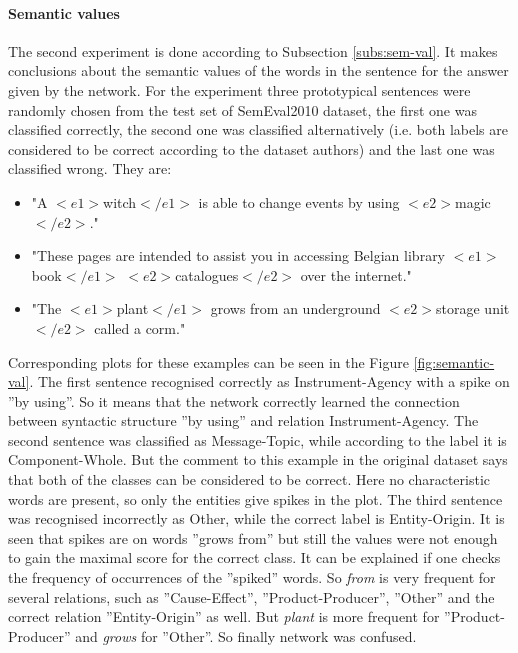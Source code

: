 \paragraph{Semantic values} The second experiment is done according to Subsection \ref{subs:sem-val}. It makes conclusions about the semantic values of the words in the sentence for the answer given by the network. For  
the experiment three prototypical sentences were randomly chosen from the test set of SemEval2010 dataset, the first one was classified 
correctly, the second one was classified alternatively (i.e. both labels are considered to be correct 
according to the dataset authors) and the last one was classified wrong. They are:
\begin{itemize}
  \item "A $<e1>$witch$</e1>$ is able to change events by using $<e2>$magic$</e2>$."
  \item "These pages are intended to assist you in accessing Belgian library $<e1>$book$</e1>$ $<e2>$catalogues$</e2>$ over the internet."
  \item "The $<e1>$plant$</e1>$ grows from an underground $<e2>$storage unit$</e2>$ called a corm."
\end{itemize} 
Corresponding plots for these examples can be seen in the Figure \ref{fig:semantic-val}. The first sentence recognised correctly as Instrument-Agency with a spike on ''by using''. So it means 
that the network correctly learned the connection between syntactic structure ''by using'' and 
relation Instrument-Agency. The second sentence was classified as Message-Topic, while according to the label it is Component-Whole. But the comment to this example in the original 
dataset says that both of the classes can be considered to be correct. Here no characteristic words are present, so only the entities 
give spikes in the plot. The third sentence was recognised incorrectly as Other, while the correct 
label is Entity-Origin. It is seen that spikes are on words ''grows from'' but still 
the values were not enough to gain the maximal score for the correct class. It can be explained if one checks the frequency of 
occurrences of the ''spiked'' words. So \textit{from} is very frequent for several relations, such as 
''Cause-Effect'', ''Product-Producer'', ''Other'' and the correct relation ''Entity-Origin'' as well. But 
\textit{plant} is more frequent for ''Product-Producer'' and \textit{grows} for ''Other''. So finally 
network was confused. 

